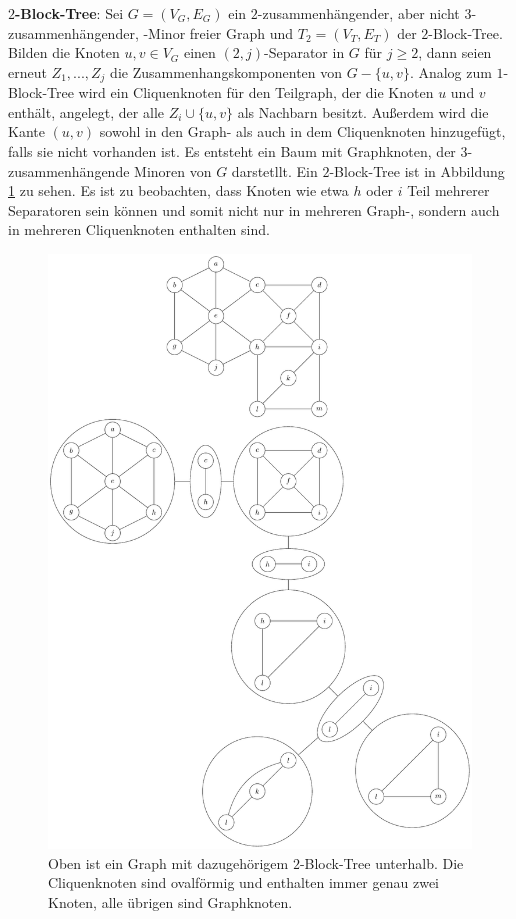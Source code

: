\textbf{$2$-Block-Tree}: Sei $G = (V_G, E_G)$ ein $2$-zusammenhängender, aber nicht $3$-zusammenhängender, \kf-Minor freier Graph und $T_2 = (V_T, E_T)$ der $2$-Block-Tree.
Bilden die Knoten $u, v \in V_G$ einen $(2, j)$-Separator in $G$ für $j \geq 2$, dann seien erneut $Z_1, ..., Z_j$ die Zusammenhangskomponenten von $G - \{u, v\}$.
Analog zum $1$-Block-Tree wird ein Cliquenknoten für den Teilgraph, der die Knoten $u$ und $v$ enthält, angelegt, der alle $Z_i \cup \{u, v\}$ als Nachbarn besitzt.
Außerdem wird die Kante $(u, v)$ sowohl in den Graph- als auch in dem Cliquenknoten hinzugefügt, falls sie nicht vorhanden ist.
Es entsteht ein Baum mit Graphknoten, der $3$-zusammenhängende Minoren von $G$ darstetllt.
Ein $2$-Block-Tree ist in Abbildung \ref{fig:2-Block-Tree} zu sehen.
Es ist zu beobachten, dass Knoten wie etwa $h$ oder $i$ Teil mehrerer Separatoren sein können und somit nicht nur in mehreren Graph-, sondern auch in mehreren Cliquenknoten enthalten sind.
\begin{figure}[H]
  \centering
  \includegraphics[width=\textwidth,height=\textheight,keepaspectratio]{bilder/2-Block-Tree.pdf}
  \caption{Oben ist ein Graph mit dazugehörigem $2$-Block-Tree unterhalb.
           Die Cliquenknoten sind ovalförmig und enthalten immer genau zwei Knoten, alle übrigen sind Graphknoten.}
  \label{fig:2-Block-Tree}
\end{figure}


